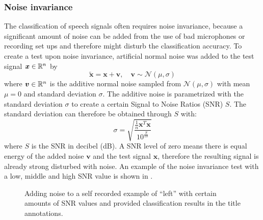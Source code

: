 \subsubsection{Noise invariance}
The classification of speech signals often requires noise invariance, because a significant amount of noise can be added from the use of bad microphones or recording set ups and therefore might disturb the classification accuracy.
To create a test upon noise invariance, artificial normal noise was added to the test signal $\bm{x} \in \mathbb{R}^n$ by
\begin{equation}
  \bm{\tilde{x}} = \bm{x} + \bm{v}, \quad \bm{v} \sim \mathcal{N}(\mu, \sigma)
\end{equation}
where $\bm{v} \in \mathbb{R}^n$ is the additive normal noise sampled from $\mathcal{N}(\mu, \sigma)$ with mean $\mu = 0$ and standard deviation $\sigma$.
The additive noise is parametrized with the standard deviation $\sigma$ to create a certain Signal to Noise Ratios (SNR) $S$.
The standard deviation can therefore be obtained through $S$ with:
\begin{equation}
  \sigma = \sqrt{\frac{\frac{1}{n}\bm{x}^T \bm{x}}{10^{\frac{S}{10}}}}
\end{equation}
where $S$ is the SNR in decibel (dB). 
A SNR level of zero means there is equal energy of the added noise $\bm{v}$ and the test signal $\bm{x}$, therefore the resulting signal is already strong disturbed with noise.
An example of the noise invariance test with a low, middle and high SNR value is shown in .
\begin{figure}[!ht]
  \centering
  \caption{Adding noise to a self recorded example of \enquote{left} with certain amounts of SNR values and provided classification results in the title annotations.}
  \label{fig:exp_details_tb_noise_left}
\end{figure}
